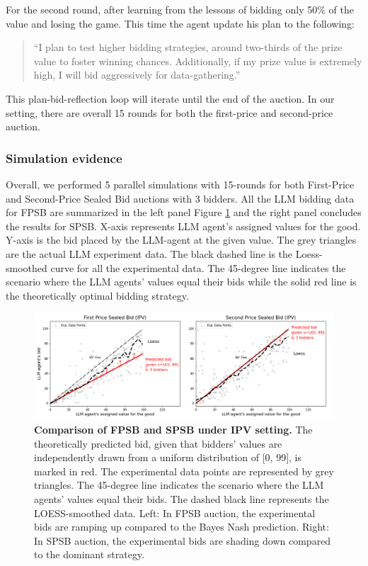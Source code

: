 \documentclass{article} %
\begin{document}
For the second round, after learning from the lessons of bidding only 50\% of the value and losing the game. This time the agent update his plan to the following:
\begin{quote}
    ``I plan to test higher bidding strategies, around two-thirds of the prize value to foster winning chances. Additionally, if my prize value is extremely high, I will bid aggressively for data-gathering.''
\end{quote}

This plan-bid-reflection loop will iterate until the end of the auction. In our setting, there are overall 15 rounds for both the first-price and second-price auction.


\subsubsection{Simulation evidence}
Overall, we performed 5 parallel simulations with 15-rounds for both First-Price and Second-Price Sealed Bid auctions with 3 bidders.
All the LLM bidding data for FPSB are summarized in the left panel Figure \ref{fig:fpsb-plan} and the right panel concludes the results for SPSB.
X-axis represents LLM agent's assigned values for the good. 
Y-axis is the bid placed by the LLM-agent at the given value.
The grey triangles are the actual LLM experiment data. 
The black dashed line is the Loess-smoothed curve for all the experimental data. 
The 45-degree line indicates
the scenario where the LLM agents’ values equal their bids while the solid red line is the theoretically optimal bidding strategy.

\begin{figure}[h]
    \centering \includegraphics[width=\linewidth]{Figs/ipv.png}
    \caption{\textbf{ Comparison of FPSB and SPSB under IPV setting.} The theoretically predicted bid, given that bidders' values are independently drawn from a uniform distribution of [0, 99], is marked in red. The experimental data points are represented by grey triangles. The 45-degree line indicates the scenario where the LLM agents' values equal their bids. The dashed black line represents the LOESS-smoothed data. Left: In FPSB auction, the experimental bids are ramping up compared to the Bayes Nash prediction. Right: In SPSB auction, the experimental bids are shading down compared to the dominant strategy.}
    \label{fig:fpsb-plan}

\end{figure}
\end{document}

